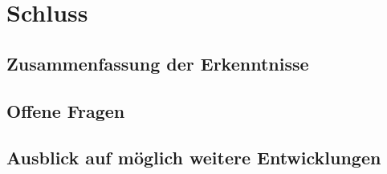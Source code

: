 \chapter{Schluss}
\section{Zusammenfassung der Erkenntnisse}
\section{Offene Fragen}
\section{Ausblick auf möglich weitere Entwicklungen}